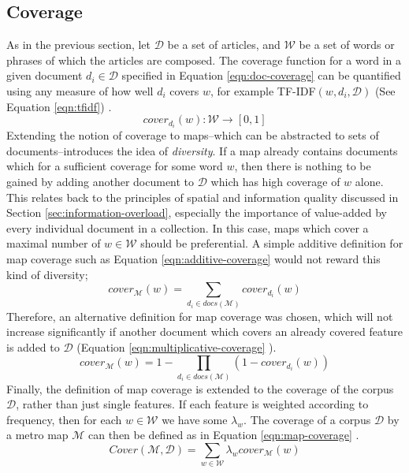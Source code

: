 \subsection{Coverage}
As in the previous section, let $\mathcal{D}$ be a set of articles, and $\mathcal{W}$ be a set of words or phrases of which the articles are composed. The coverage function for a word in a given document $d_i \in \mathcal{D}$ specified in Equation \ref{eqn:doc-coverage} can be quantified using any measure of how well $d_i$ covers $w$, for example TF-IDF$(w, d_i, \mathcal{D})$ (See Equation \ref{eqn:tfidf}) \citep{GeneratingInformationMaps}.
\begin{equation}
	\label{eqn:doc-coverage}
	cover_{d_i}(w) : \mathcal{W} \rightarrow [0,1]
\end{equation}
Extending the notion of coverage to maps--which can be abstracted to sets of documents--introduces the idea of \textit{diversity}. If a map already contains documents which for a sufficient coverage for some word $w$, then there is nothing to be gained by adding another document to $\mathcal{D}$ which has high coverage of $w$ alone. This relates back to the principles of spatial and information quality discussed in Section \ref{sec:information-overload}, especially the importance of value-added by every individual document in a collection. In this case, maps which cover a maximal number of $w \in \mathcal{W}$ should be preferential. A simple additive definition for map coverage such as Equation \ref{eqn:additive-coverage} \citep{GeneratingInformationMaps} would not reward this kind of diversity;
\begin{equation}
	\label{eqn:additive-coverage}
	cover_\mathcal{M}(w) = \sum_{d_i\in docs(\mathcal{M})}cover_{d_i}(w)
\end{equation}
Therefore, an alternative definition for map coverage was chosen, which will not increase significantly if another document which covers an already covered feature is added to $\mathcal{D}$ (Equation \ref{eqn:multiplicative-coverage} \citep{GeneratingInformationMaps}).
\begin{equation}
	\label{eqn:multiplicative-coverage}
	cover_\mathcal{M}(w) = 1 - \prod_{d_i\in docs(\mathcal{M})}(1-cover_{d_i}(w))
\end{equation}
Finally, the definition of map coverage is extended to the coverage of the corpus $\mathcal{D}$, rather than just single features. If each feature is weighted according to frequency, then for each $w \in \mathcal{W}$ we have some $\lambda_w$. The coverage of a corpus $\mathcal{D}$ by a metro map $\mathcal{M}$ can then be defined as in Equation \ref{eqn:map-coverage} \citep{GeneratingInformationMaps}.
\begin{equation}
	\label{eqn:map-coverage}
	Cover(\mathcal{M}, \mathcal{D}) = \sum_{w \in \mathcal{W}}\lambda_w cover_\mathcal{M}(w)
\end{equation}

